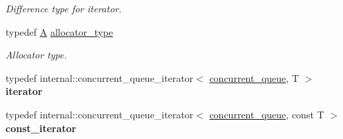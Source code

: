 \begin{DoxyCompactItemize}
\begin{DoxyCompactList}\small\item\em Difference type for iterator. \end{DoxyCompactList}\item 
\hypertarget{classtbb_1_1strict__ppl_1_1concurrent__queue_acbdd1a5bd034358fb0774b322a66b1ed}{}typedef \hyperlink{structA}{A} \hyperlink{classtbb_1_1strict__ppl_1_1concurrent__queue_acbdd1a5bd034358fb0774b322a66b1ed}{allocator\+\_\+type}\label{classtbb_1_1strict__ppl_1_1concurrent__queue_acbdd1a5bd034358fb0774b322a66b1ed}

\begin{DoxyCompactList}\small\item\em Allocator type. \end{DoxyCompactList}\item 
\hypertarget{classtbb_1_1strict__ppl_1_1concurrent__queue_ab1361aa7fd454fe593609be740ab8a4c}{}typedef internal\+::concurrent\+\_\+queue\+\_\+iterator$<$ \hyperlink{classtbb_1_1strict__ppl_1_1concurrent__queue}{concurrent\+\_\+queue}, T $>$ {\bfseries iterator}\label{classtbb_1_1strict__ppl_1_1concurrent__queue_ab1361aa7fd454fe593609be740ab8a4c}

\item 
\hypertarget{classtbb_1_1strict__ppl_1_1concurrent__queue_a674e375edf0a3463ae1cec5d6158593d}{}typedef internal\+::concurrent\+\_\+queue\+\_\+iterator$<$ \hyperlink{classtbb_1_1strict__ppl_1_1concurrent__queue}{concurrent\+\_\+queue}, const T $>$ {\bfseries const\+\_\+iterator}\label{classtbb_1_1strict__ppl_1_1concurrent__queue_a674e375edf0a3463ae1cec5d6158593d}

\end{DoxyCompactItemize}
